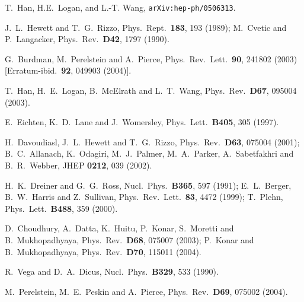 \documentclass[12pt,prd,aps,floats,preprintnumbers,preprint,superscriptaddress,floatfix,nofootinbib]{revtex4}
\begin{document}
\begin{thebibliography}{99}
T.~Han,  H.E.~Logan, and L.-T. Wang,  {\tt arXiv:hep-ph/0506313}.

J.~L.~Hewett and T.~G.~Rizzo,
  Phys.\ Rept.\  {\bf 183}, 193 (1989);  M.~Cvetic and P.~Langacker,
  Phys.\ Rev.\ {\bf D42}, 1797 (1990).

G.~Burdman, M.~Perelstein and A.~Pierce,
  Phys.\ Rev.\ Lett.\  {\bf 90}, 241802 (2003)
  [Erratum-ibid.\  {\bf 92}, 049903 (2004)].

  T.~Han, H.~E.~Logan, B.~McElrath and L.~T.~Wang,
  Phys.\ Rev.\  {\bf D67}, 095004 (2003).

 E.~Eichten, K.~D.~Lane and J.~Womersley,
  Phys.\ Lett.\  {\bf B405}, 305 (1997).
 
H.~Davoudiasl, J.~L.~Hewett and T.~G.~Rizzo,
  Phys.\ Rev.\  {\bf D63}, 075004 (2001);
 B.~C.~Allanach, K.~Odagiri, M.~J.~Palmer, M.~A.~Parker, A.~Sabetfakhri and B.~R.~Webber,
  JHEP {\bf 0212}, 039 (2002).

  H.~K.~Dreiner and G.~G.~Ross,
  Nucl.\ Phys.\  {\bf B365}, 597 (1991); 
  E.~L.~Berger, B.~W.~Harris and Z.~Sullivan,
  Phys.\ Rev.\ Lett.\  {\bf 83}, 4472 (1999);
T.~Plehn, 
  Phys.\ Lett.\  {\bf B488}, 359 (2000).

 D.~Choudhury, A.~Datta, K.~Huitu, P.~Konar, S.~Moretti and B.~Mukhopadhyaya,
  Phys.\ Rev.\  {\bf D68}, 075007 (2003);
 P.~Konar and B.~Mukhopadhyaya,
  Phys.\ Rev.\  {\bf D70}, 115011 (2004).
 
 R.~Vega and D.~A.~Dicus,
  Nucl.\ Phys.\  {\bf B329}, 533 (1990).
 
 M.~Perelstein, M.~E.~Peskin and A.~Pierce,
  Phys.\ Rev.\  {\bf D69}, 075002 (2004).
 

\end{thebibliography}
\end{document}
